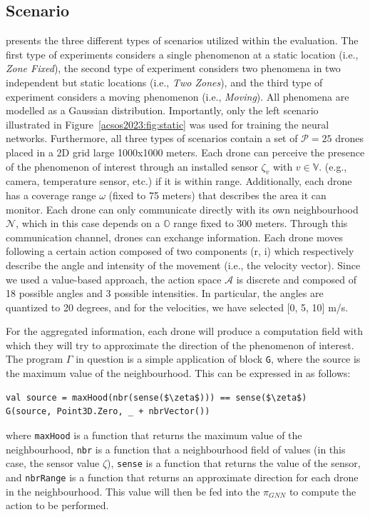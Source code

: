 \subsection{Scenario}
 presents the three different types of scenarios utilized within the evaluation. 
 The first type of experiments considers a single phenomenon at a static location (i.e., \emph{Zone Fixed}), 
 the second type of experiment considers two phenomena in two independent but static locations (i.e., \emph{Two Zones}), 
 and the third type of experiment considers a moving phenomenon (i.e., \emph{Moving}). 
 All phenomena are modelled as a Gaussian distribution. 
 Importantly, only the left scenario illustrated in Figure~\ref{acsos2023:fig:static} was used for training the neural networks. 
Furthermore, all three types of scenarios contain a set of $\mathcal{P} = 25$ drones placed in a 2D grid large 1000x1000 meters. %
Each drone can perceive the presence
 of the phenomenon of interest through an installed sensor $\zeta_v$ with $v \in \mathbb{V}$. 
 (e.g., camera, temperature sensor, etc.) if it is within range.
%
Additionally, each drone has a coverage range $\omega$ (fixed to 75 meters) 
 that describes the area it can monitor. 
 Each drone can only communicate directly with its own neighbourhood $\mathcal{N}$, 
 which in this case depends on a $\mathbb{O}$ range fixed to 300 meters. %
Through this communication channel, drones can exchange information. 
%
Each drone moves following a certain action composed of two components (r, i) 
 which respectively describe the angle and intensity of the movement (i.e., the velocity vector).
Since we used a value-based approach, 
 the action space $\mathcal{A}$ is discrete and composed of 18 possible angles and 3 possible intensities.
In particular, the angles are quantized to 20 degrees, and for the velocities, we have selected [0, 5, 10] m/s.
%

For the aggregated information, each drone will produce a computation field with which they will try to approximate the direction of the phenomenon of interest. 
%
%
The program $\Gamma$ in question is a simple application of block \lstinline|G|, where the source is the maximum value of the neighbourhood. 
This can be expressed in \scafi{} as follows:
\begin{lstlisting}[mathescape=true]
val source = maxHood(nbr(sense($\zeta$))) == sense($\zeta$)
G(source, Point3D.Zero, _ + nbrVector())
\end{lstlisting}
where \texttt{maxHood} is a function that returns the maximum value of the neighbourhood, 
 \texttt{nbr} is a function that a neighbourhood field of values (in this case, the sensor value $\zeta$),
\texttt{sense} is a function that returns the value of the sensor, and
\texttt{nbrRange} is a function that returns an approximate direction for each drone in the neighbourhood.
%
This value will then be fed into the $\pi_{GNN}$ to compute the action to be performed.
